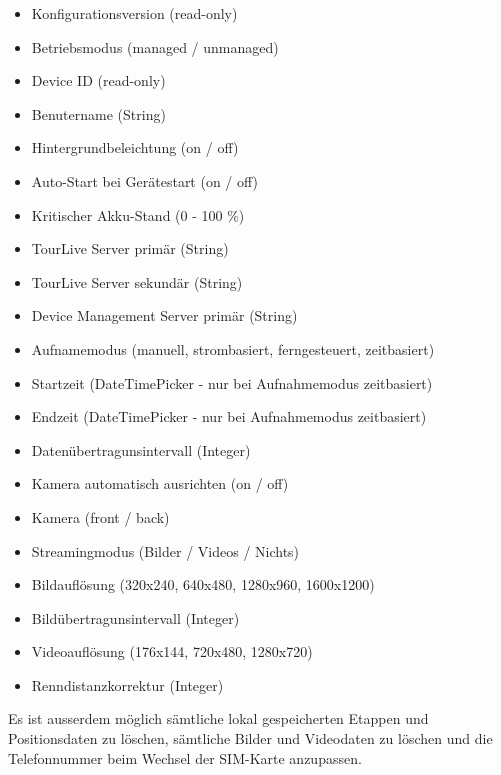 \begin{itemize}
	\item Konfigurationsversion (read-only)
	\item Betriebsmodus (managed / unmanaged)
	\item Device ID (read-only)
	\item Benutername (String)
	\item Hintergrundbeleichtung (on / off)
	\item Auto-Start bei Gerätestart (on / off)
	\item Kritischer Akku-Stand (0 - 100 \%)
	\item TourLive Server primär (String)
	\item TourLive Server sekundär (String)
	\item Device Management Server primär (String)
	\item Aufnamemodus (manuell, strombasiert, ferngesteuert, zeitbasiert)
	\item Startzeit (DateTimePicker - nur bei Aufnahmemodus zeitbasiert)
	\item Endzeit (DateTimePicker - nur bei Aufnahmemodus zeitbasiert)
	\item Datenübertragunsintervall (Integer)
	\item Kamera automatisch ausrichten (on / off)
	\item Kamera (front / back)
	\item Streamingmodus (Bilder / Videos / Nichts)
	\item Bildauflösung (320x240, 640x480, 1280x960, 1600x1200)
	\item Bildübertragunsintervall (Integer)
	\item Videoauflösung (176x144, 720x480, 1280x720)
	\item Renndistanzkorrektur (Integer)
\end{itemize}
Es ist ausserdem möglich sämtliche lokal gespeicherten Etappen und Positionsdaten zu löschen, sämtliche Bilder und Videodaten zu löschen und die Telefonnummer beim Wechsel der SIM-Karte anzupassen.

